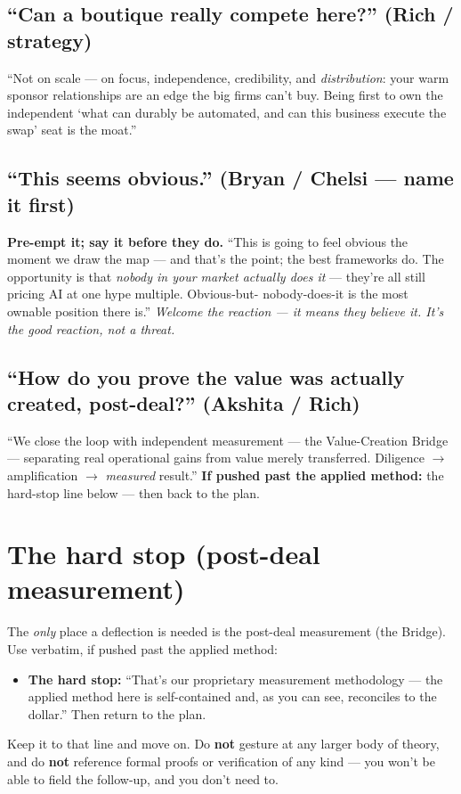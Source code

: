 \documentclass[11pt]{article}
\begin{document}
\subsection{``Can a boutique really compete here?'' \textnormal{(Rich / strategy)}}
``Not on scale --- on focus, independence, credibility, and \emph{distribution}: your warm
sponsor relationships are an edge the big firms can't buy. Being first to own the independent
`what can durably be automated, and can this business execute the swap' seat is the moat.''

\subsection{``This seems obvious.'' \textnormal{(Bryan / Chelsi --- name it first)}}
\textbf{Pre-empt it; say it before they do.} ``This is going to feel obvious the moment we draw
the map --- and that's the point; the best frameworks do. The opportunity is that \emph{nobody in
your market actually does it} --- they're all still pricing AI at one hype multiple. Obvious-but-
nobody-does-it is the most ownable position there is.'' \emph{Welcome the reaction --- it means
they believe it. It's the good reaction, not a threat.}

\subsection{``How do you prove the value was actually created, post-deal?'' \textnormal{(Akshita / Rich)}}
``We close the loop with independent measurement --- the Value-Creation Bridge --- separating
real operational gains from value merely transferred. Diligence $\rightarrow$ amplification
$\rightarrow$ \emph{measured} result.'' \textbf{If pushed past the applied method:} the hard-stop
line below --- then back to the plan.

\section{The hard stop (post-deal measurement)}
The \emph{only} place a deflection is needed is the post-deal measurement (the Bridge). Use
verbatim, if pushed past the applied method:
\begin{itemize}
  \item \textbf{The hard stop:} ``That's our proprietary measurement methodology --- the applied
  method here is self-contained and, as you can see, reconciles to the dollar.'' Then return to
  the plan.
\end{itemize}
Keep it to that line and move on. Do \textbf{not} gesture at any larger body of theory, and do
\textbf{not} reference formal proofs or verification of any kind --- you won't be able to field
the follow-up, and you don't need to.
\end{document}
